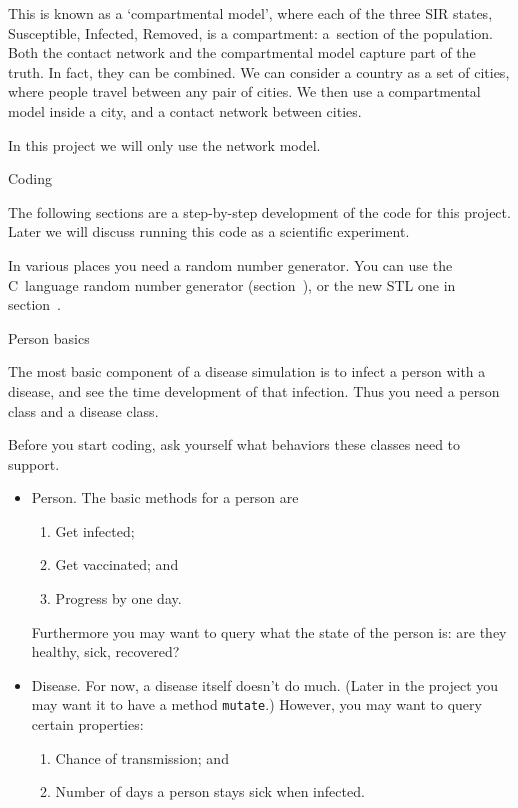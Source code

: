 
This is known as a `compartmental model', where each of the three SIR states,
Susceptible, Infected, Removed,
is a compartment: a~section of the population.
Both the contact network and
the compartmental model capture part of the truth. In fact, they can
be combined. We can consider a country as a set of cities, where
people travel between any pair of cities. We then use a compartmental
model inside a city, and a contact network between cities.

In this project we will only use the network model.

 {Coding}

The following sections are a step-by-step
development of the code for this project.
Later we will discuss running this code
as a scientific experiment.

\begin{remark}
  In various places you need a random number generator.
  You can use the C~language random number generator
  (section~),
  or the new \ac{STL} one in section~.
\end{remark}

 {Person basics}

The most basic component of a disease simulation
is to infect a person with a disease,
and see the time development of that infection.
Thus you need a person class and a disease class.

Before you start coding, ask yourself
what behaviors these classes need to support.
\begin{itemize}
\item Person. The basic methods for a person are
  \begin{enumerate}
  \item Get infected;
  \item Get vaccinated; and
  \item Progress by one day.
  \end{enumerate}
  Furthermore you may want to query what the state of the person is:
  are they healthy, sick, recovered?
\item Disease. For now, a disease itself doesn't do much.
  (Later in the project you may want it to have a method \lstinline{mutate}.)
  However, you may want to query certain properties:
  \begin{enumerate}
  \item Chance of transmission; and
  \item Number of days a person stays sick when infected.
  \end{enumerate}
\end{itemize}


